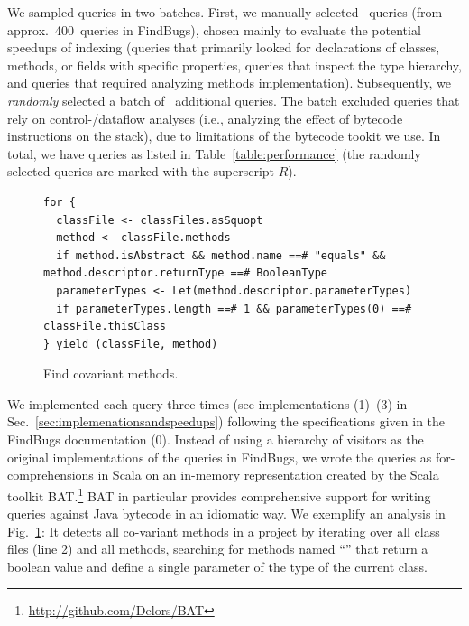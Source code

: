 We sampled queries in two batches. First, we manually selected \manualQueryCount~queries (from approx.\ 400~queries in FindBugs), chosen mainly to evaluate the potential speedups of indexing (queries that primarily looked for declarations of classes, methods, or fields with specific properties, queries that inspect the type hierarchy, and queries that required analyzing methods implementation).
Subsequently, we \emph{randomly} selected a batch of \randomQueryCount~additional queries. 
The batch excluded queries that rely on control-/dataflow analyses (i.e., analyzing the effect of bytecode instructions on the stack), due to limitations of the bytecode tookit we use.
In total, we have \queryCount{} queries as listed in Table~\ref{table:performance} (the randomly selected queries are marked with the superscript $R$).




\begin{figure}
\centering
\begin{lstlisting}
for {
  classFile <- classFiles.asSquopt
  method <- classFile.methods
  if method.isAbstract && method.name ==# "equals" && method.descriptor.returnType ==# BooleanType
  parameterTypes <- Let(method.descriptor.parameterTypes)
  if parameterTypes.length ==# 1 && parameterTypes(0) ==# classFile.thisClass
} yield (classFile, method)
\end{lstlisting}
\caption{Find covariant  methods.}
\label{fig:covariant-equals}
\end{figure}



We implemented each query three times (see implementations (1)--(3) in Sec.~\ref{sec:implemenationsandspeedups}) following the specifications given in the FindBugs documentation (0). Instead of using a hierarchy of visitors as the original implementations of the queries in FindBugs, we wrote the queries as for-comprehensions in Scala on an in-memory representation created by the Scala toolkit BAT\@.\footnote{\url{http://github.com/Delors/BAT}}
BAT in particular provides comprehensive support for 
writing queries against Java bytecode in an idiomatic way.
We exemplify an analysis in Fig.~\ref{fig:covariant-equals}: It detects all co-variant  methods in a project by iterating over all class files (line 2) and all methods, searching for methods named ``'' that return a boolean value and define a single parameter of the type of the current class. 



